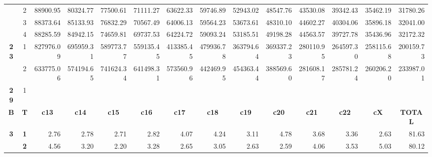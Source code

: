 \begin{table}[h!]
{\begin{tabular}{@{} ccrrrrrrrrrrrr}
   & 2 & 88900.95  & 80324.77  & 77500.61  & 71111.27  & 63622.33  & 59746.89  & 52943.02  & 48547.76  & 43530.08  & 39342.43  & 35462.19  & 31780.26  \\
   & 3 & 88373.64  & 85133.93  & 76832.29  & 70567.49  & 64006.13  & 59564.23  & 53673.61  & 48310.10  & 44602.27  & 40304.06  & 35896.18  & 32041.00  \\
   & 4 & 88285.59  & 84942.15  & 74659.81  & 69737.53  & 64224.72  & 59093.24  & 53185.51  & 49198.28  & 44563.57  & 39727.78  & 35436.96  & 32172.32  \\
\textbf{23} & 1 & 827976.09 & 695959.31 & 589773.77 & 559135.45 & 413385.45 & 479936.78 & 363794.64 & 369337.23 & 280110.95 & 264597.30 & 258115.68 & 200159.73 \\
   & 2 & 633775.06 & 574194.65 & 741624.34 & 641498.31 & 573560.96 & 442469.95 & 454363.44 & 388569.60 & 281608.17 & 285781.24 & 260206.20 & 233987.01 \\
\textbf{29} & 1 &           &           &           &           &           &           &           &           &           &           &           &          \\
\midrule
\textbf{B}  & \textbf{T}  & \multicolumn{1}{c}{\textbf{c13}} & \multicolumn{1}{c}{\textbf{c14}} & \multicolumn{1}{c}{\textbf{c15}} & \multicolumn{1}{c}{\textbf{c16}} & \multicolumn{1}{c}{\textbf{c17}} & \multicolumn{1}{c}{\textbf{c18}} & \multicolumn{1}{c}{\textbf{c19}} & \multicolumn{1}{c}{\textbf{c20}} & \multicolumn{1}{c}{\textbf{c21}} & \multicolumn{1}{c}{\textbf{c22}} & \multicolumn{1}{c}{\textbf{cX}} & \multicolumn{1}{c}{\textbf{TOTAL}} \\
\hline
\textbf{3}  & \textbf{1}                     & 2.76                             & 2.78                             & 2.71                             & 2.82                             & 4.07                             & 4.24                             & 3.11                             & 4.78                             & 3.68                             & 3.36                             & 2.63                            & 81.63                              \\
\textbf{}   & \textbf{2}                     & 4.56                             & 3.20                             & 2.20                             & 3.28                             & 2.65                             & 3.05                             & 2.63                             & 2.59                             & 4.06                             & 3.53                             & 5.03                            & 80.12                              \\

\end{tabular}}
\end{table}
